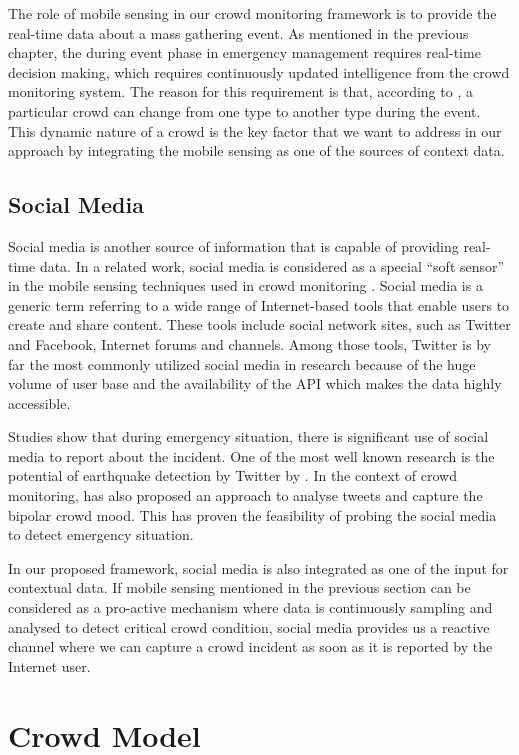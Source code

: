 The role of mobile sensing in our crowd monitoring framework is to provide the real-time data about a mass gathering event. As mentioned in the previous chapter, the during event phase in emergency management requires real-time decision making, which requires continuously updated intelligence from the crowd monitoring system. The reason for this requirement is that, according to \citet{Berlonghi1995}, a particular crowd can change from one type to another type during the event. This dynamic nature of a crowd is the key factor that we want to address in our approach by integrating the mobile sensing as one of the sources of context data.

\subsection{Social Media}

Social media is another source of information that is capable of providing real-time data. In a related work, social media is considered as a special ``soft sensor'' in the mobile sensing techniques used in crowd monitoring \citep{Ramesh2014}. Social media is a generic term referring to a wide range of Internet-based tools that enable users to create and share content. These tools include social network sites, such as Twitter and Facebook, Internet forums and channels. Among those tools, Twitter is by far the most commonly utilized social media in research because of the huge volume of user base and the availability of the API which makes the data highly accessible.

Studies show that during emergency situation, there is significant use of social media to report about the incident. One of the most well known research is the potential of earthquake detection by Twitter by \citet{Sakaki2010}. In the context of crowd monitoring, \citet{DelirHaghighi2013} has also proposed an approach to analyse tweets and capture the bipolar crowd mood. This has proven the feasibility of probing the social media to detect emergency situation.

In our proposed framework, social media is also integrated as one of the input for contextual data. If mobile sensing mentioned in the previous section can be considered as a pro-active mechanism where data is continuously sampling and analysed to detect critical crowd condition, social media provides us a reactive channel where we can capture a crowd incident as soon as it is reported by the Internet user. 

\section{Crowd Model}

